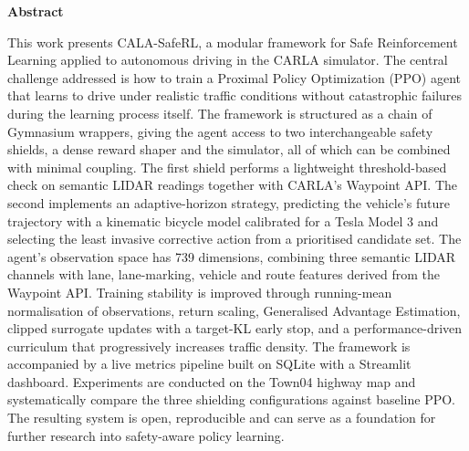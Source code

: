 %

\cleardoublepage
{}
\pagestyle{headings}

\vspace*{3cm}

{\bfseries\Large Abstract\par}
\vspace{0.5cm}

\noindent
This work presents CALA-SafeRL, a modular framework for Safe Reinforcement Learning applied to
autonomous driving in the CARLA simulator. The central challenge addressed is how to train a
Proximal Policy Optimization (PPO) agent that learns to drive under realistic traffic conditions
without catastrophic failures during the learning process itself. The framework is structured as a
chain of Gymnasium wrappers, giving the agent access to two interchangeable safety shields, a
dense reward shaper and the simulator, all of which can be combined with minimal coupling.
The first shield performs a lightweight threshold-based check on semantic LIDAR readings together with
CARLA's Waypoint API. The second implements an adaptive-horizon strategy, predicting the vehicle's
future trajectory with a kinematic bicycle model calibrated for a Tesla Model 3 and selecting the
least invasive corrective action from a prioritised candidate set. The agent's observation space
has 739 dimensions, combining three semantic LIDAR channels with lane, lane-marking, vehicle and
route features derived from the Waypoint API. Training stability is improved through running-mean normalisation of observations,
return scaling, Generalised Advantage Estimation, clipped surrogate updates with a
target-KL early stop, and a performance-driven curriculum that progressively increases traffic
density. The framework is accompanied by a live metrics pipeline built on SQLite with a Streamlit
dashboard. Experiments are conducted on the Town04 highway map and systematically compare the
three shielding configurations against baseline PPO. The resulting system is open, reproducible and
can serve as a foundation for further research into safety-aware policy learning.

\vspace{2cm}

\cleardoublepage
